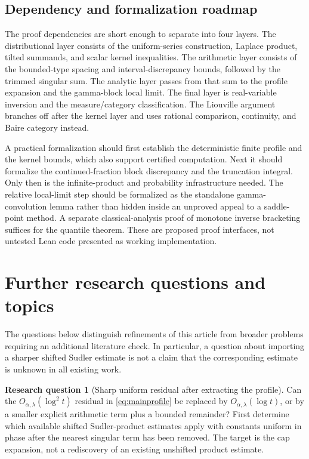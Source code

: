 \documentclass[11pt,a4paper]{article}
\theoremstyle{definition}
\newtheorem{problem}[theorem]{Research question}
\theoremstyle{remark}\newtheorem{remark}[theorem]{Remark}
\newcommand{\at}{\alpha,\lambda}
\begin{document}
\subsection{Dependency and formalization roadmap}

The proof dependencies are short enough to separate into four layers.
The distributional layer consists of the uniform-series construction,
Laplace product, tilted summands, and scalar kernel inequalities.  The
arithmetic layer consists of the bounded-type spacing and interval-discrepancy
bounds, followed by the trimmed singular sum.  The analytic layer passes
from that sum to the profile expansion and the gamma-block local limit.
The final layer is real-variable inversion and the measure/category
classification.  The Liouville argument branches off after the kernel layer
and uses rational comparison, continuity, and Baire category instead.

A practical formalization should first establish the deterministic finite
profile and the kernel bounds, which also support certified computation.
Next it should formalize the continued-fraction block discrepancy and the
truncation integral.  Only then is the infinite-product and probability
infrastructure needed.  The relative local-limit step should be formalized
as the standalone gamma-convolution lemma rather than hidden inside an
unproved appeal to a saddle-point method.  A separate classical-analysis
proof of monotone inverse bracketing suffices for the quantile theorem.
These are proposed proof interfaces, not untested Lean code presented as
working implementation.

\section{Further research questions and topics}
\label{sec:future}

The questions below distinguish refinements of this article from broader
problems requiring an additional literature check.  In particular, a question
about importing a sharper shifted Sudler estimate is not a claim that the
corresponding estimate is unknown in all existing work.

\begin{problem}[Sharp uniform residual after extracting the profile]
Can the $O_{\at}(\log^2 t)$ residual in
\eqref{eq:mainprofile} be replaced by $O_{\at}(\log t)$, or by a smaller
explicit arithmetic term plus a bounded remainder?  First determine which
available shifted Sudler-product estimates apply with constants uniform in
phase after the nearest singular term has been removed.  The target is the
cap expansion, not a rediscovery of an existing unshifted product estimate.
\end{problem}
\end{document}
